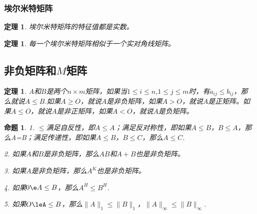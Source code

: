 \documentclass{article}
\begin{document}
\subsubsection{埃尔米特矩阵}
\newtheorem{thm}{定理}
\begin{thm}
埃尔米特矩阵的特征值都是实数。
\end{thm}

\newtheorem{thm}{定理}
\begin{thm}
每一个埃尔米特矩阵相似于一个实对角线矩阵。
\end{thm}



\subsection{非负矩阵和$M$矩阵}
\newtheorem{definition}{定理}
\begin{definition}
$A$和$B$是两个$n\times m$矩阵，如果当$1\le i\le n$,$1\le j\le m$时，有$a_{ij}\le b_{ij}$，那么就说$A\le B$.如果$A\geqslant O$，就说$A$是非负矩阵，如果$A>O$，就说$A$是正矩阵。如果$A\le O$，就说$A$是非正矩阵，如果$A<O$，就说$A$是负矩阵。
\end{definition}

\newtheorem{proposition}{命题}
\begin{proposition}

1. $\le$满足自反性，即$A\le A$；满足反对称性，即如果$A\le B$，$B\le A$，那么A=B；满足传递性，即如果$A\le B$，$B\le C$，那么$A\le C$.

2. 如果$A$和$B$是非负矩阵，那么$AB$和$A+B$也是非负矩阵。

3. 如果$A$是非负矩阵，那么$A^K$也是非负矩阵。

4. 如果$0\e A\le B$，那么$A^H\le B^H$.

5. 如果$O\leA\le B$，那么$\parallel A\parallel _1\le\parallel B\parallel _1$，$\parallel A\parallel _{\infty}\le\parallel B\parallel _{\infty}$.
\end{proposition}
\end{document}
